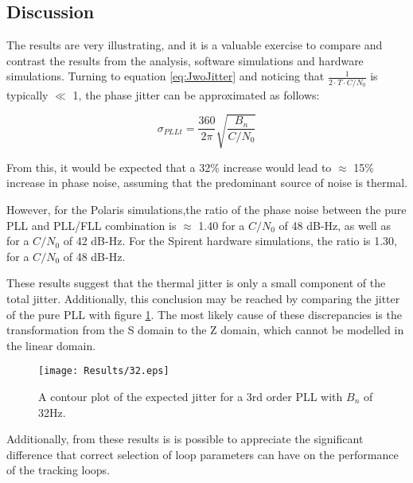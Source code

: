 \clearpage
\subsection{Discussion}

The results are very illustrating, and it is a valuable exercise to compare and contrast the results from the analysis, software simulations and hardware simulations. Turning to equation \ref{eq:JwoJitter} and noticing that $\frac{1}{2 \cdot T \cdot C/N_0}$ is typically $\ll$ 1, the phase jitter can be approximated as follows:

\begin{equation}
\sigma_{PLLt} = \frac{360}{2\pi} \sqrt{\frac{B_n}{C/N_0}}
\end{equation}

From this, it would be expected that a 32\% increase would lead to $\approx$ 15\% increase in phase noise, assuming that the predominant source of noise is thermal.

However, for the Polaris simulations,the  ratio of the phase noise between the pure PLL and PLL/FLL combination is $\approx$ 1.40 for a $C/N_0$ of 48 dB-Hz, as well as for a $C/N_0$ of 42 dB-Hz. For the Spirent hardware simulations, the ratio is 1.30, for a $C/N_0$ of 48 dB-Hz.

These results suggest that the thermal jitter is only a small component of the total jitter. Additionally, this conclusion may be reached by comparing the jitter of the pure PLL with figure \ref{fig:ContourPLL32Results}. The most likely cause of these discrepancies is the transformation from the S domain to the Z domain, which cannot be modelled in the linear domain. 

\begin{figure}[!htb] 
    \centering
    \texttt{[image: Results/32.eps]} 
    \caption{A contour plot of the expected jitter for a 3rd order PLL with $B_n$ of 32Hz.}
    \label{fig:ContourPLL32Results}
\end{figure}


Additionally, from these results is is possible to appreciate the significant difference that correct selection of loop parameters can have on the performance of the tracking loops. 



